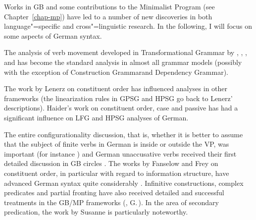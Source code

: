 Works in GB and some contributions to the Minimalist Program (see Chapter~\ref{chap-mp}) have led to a number of new discoveries in both language"=specific and cross"=linguistic research. In
the following, I will focus on some aspects of German syntax.

The analysis of verb movement developed in Transformational Grammar by \citet*[]{Bierwisch63}, \citet{Reis74a},
\citet{Koster75a}, \citet[Chapter~1]{Thiersch78a} and \citet{denBesten83a} has become the standard analysis in almost
all grammar models (possibly with the exception of Construction Grammar\indexcxg and Dependency Grammar\indexdg).

The work by Lenerz on constituent order \citeyearpar{Lenerz77} has influenced analyses in other frameworks
(the linearization rules in GPSG and HPSG go back to Lenerz' descriptions). Hai\-der's work on constituent order,
case and passive \citeyearpar{Haider84b,Haider85,Haider85b,Haider86,Haider90a,Haider93a} has had a significant influence on LFG
and HPSG analyses of German.

The entire configurationality discussion, that is, whether it is better to assume that the 
subject of finite verbs in German is inside or outside the VP, was important
(for instance \citealp*{Haider82,Grewendorf83a,Kratzer84a,Webelhuth85a,%
Sternefeld85b,%
Scherpenisse86a,%
Fanselow87a,Grewendorf88a,Duerscheid89a,Webelhuth90,%
Oppenrieder91a,%
Wilder91a,Haider93a,Grewendorf93,%
Frey93a,%
Lenerz94a,%
Meinunger2000a%
}) and German unaccusative verbs received their first detailed discussion in GB circles 
\citep{Grewendorf89a,Fanselow92-ohne-anfuehrungszeichen}. The works by Fanselow and Frey on constituent order, in 
particular with regard to information structure, have advanced German syntax quite considerably
\citep{Fanselow88,Fanselow90,Fanselow93a,Fanselow2000a,Fanselow2001a,Fanselow2003d,Fanselow2003a,Fanselow2004a,Frey2000a-u,Frey2001a,Frey2004a,Frey2005a}.
Infinitive constructions, complex predicates and partial fronting have also received detailed and successful treatments
in the GB/MP frameworks
(\citealp{Bierwisch63,Evers75a,Haider82,Haider86c,Haider90b,Haider91,Haider93a,Grewendorf83a,Grewendorf87a,Grewendorf88a,denBesten85b,Sternefeld85b,Fanselow87a,Fanselow2002a,SS88a,BK89a}, G.\,\citealp{GMueller96a,GMueller98a,VS98a}).
In the area of secondary predication, the work by Susanne \citet{Winkler97a} is particularly noteworthy.

